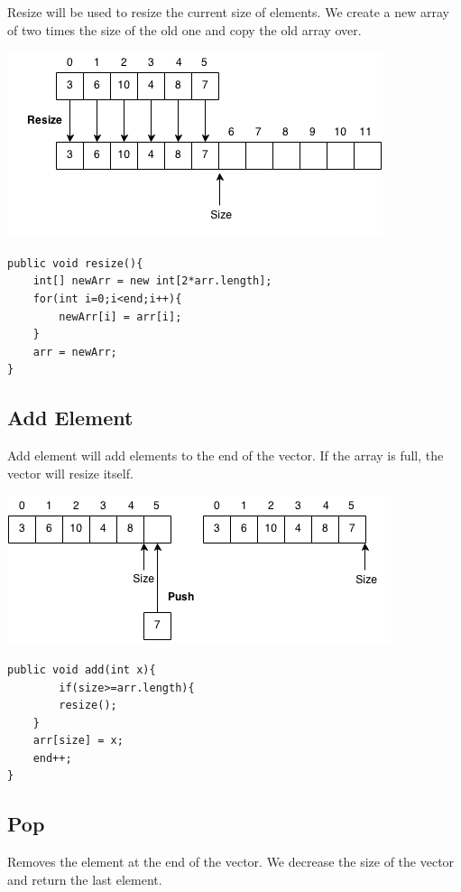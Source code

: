 \documentclass[11pt,oneside]{book}
\makeatletter
\def\maxwidth#1{\ifdim\Gin@nat@width>#1 #1\else\Gin@nat@width\fi}
\makeatother
\begin{document}
Resize will be used to resize the current size of elements. We create a new array of two times the size of the old one and copy the old array over.

\includegraphics[width=\maxwidth{\textwidth}]{vector3.png}

\begin{lstlisting}
public void resize(){
    int[] newArr = new int[2*arr.length];
    for(int i=0;i<end;i++){
        newArr[i] = arr[i];
    }
    arr = newArr;
}
\end{lstlisting}

\subsection{Add Element}

Add element will add elements to the end of the vector. If the array is full, the vector will resize itself.

\includegraphics[width=\maxwidth{\textwidth}]{vector2.png}

\begin{lstlisting}
public void add(int x){
        if(size>=arr.length){
        resize();
    }
    arr[size] = x;
    end++;
}
\end{lstlisting}

\subsection{Pop}

Removes the element at the end of the vector. We decrease the size of the vector and return the last element.
\end{document}
